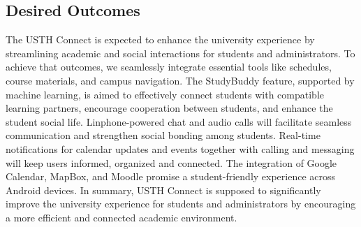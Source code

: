 \documentclass[12pt]{article}
\begin{document}
\subsection{Desired Outcomes}  
The USTH Connect is expected to enhance the university experience by streamlining academic and social interactions for students and administrators.
To achieve that outcomes, we seamlessly integrate essential tools like schedules, course materials, and campus navigation.
The StudyBuddy feature, supported by machine learning, is aimed to effectively connect students with compatible learning partners, encourage cooperation between students, and enhance the student social life.
Linphone-powered chat and audio calls will facilitate seamless communication and strengthen social bonding among students.
Real-time notifications for calendar updates and events together with calling and messaging will keep users informed, organized and connected.
The integration of Google Calendar, MapBox, and Moodle promise a student-friendly experience across Android devices.
In summary, USTH Connect is supposed to significantly improve the university experience for students and administrators by encouraging a more efficient and connected academic environment.
\end{document}

